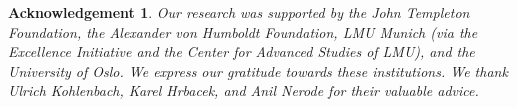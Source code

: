 \documentclass[reqno]{amsart}
\newtheorem{ack}[thm]{Acknowledgement}
\def\bye{\end{document}}
\numberwithin{equation}{section}
\numberwithin{thm}{section}
\begin{document}
\begin{ack}\rm
Our research was supported by the John Templeton Foundation, the Alexander von Humboldt Foundation, LMU Munich (via the Excellence Initiative and the Center for Advanced Studies of LMU), and the University of Oslo.
We express our gratitude towards these institutions. 
We thank Ulrich Kohlenbach, Karel Hrbacek, and Anil Nerode for their valuable advice.  
\end{ack}



\begin{bibdiv}
\begin{biblist}
\end{biblist}
\end{bibdiv}


\bye
\end{document}
